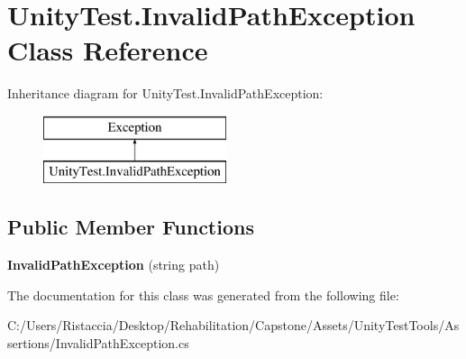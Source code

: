 \hypertarget{class_unity_test_1_1_invalid_path_exception}{}\section{Unity\+Test.\+Invalid\+Path\+Exception Class Reference}
\label{class_unity_test_1_1_invalid_path_exception}
Inheritance diagram for Unity\+Test.\+Invalid\+Path\+Exception\+:\begin{figure}[H]
\begin{center}
\leavevmode
\includegraphics[height=2.000000cm]{class_unity_test_1_1_invalid_path_exception}
\end{center}
\end{figure}
\subsection*{Public Member Functions}
\begin{DoxyCompactItemize}
\item 
\mbox{\label{class_unity_test_1_1_invalid_path_exception_a3a3dfe68665e068e34a87ed8473cde4d}} 
{\bfseries Invalid\+Path\+Exception} (string path)
\end{DoxyCompactItemize}


The documentation for this class was generated from the following file\+:\begin{DoxyCompactItemize}
\item 
C\+:/\+Users/\+Ristaccia/\+Desktop/\+Rehabilitation/\+Capstone/\+Assets/\+Unity\+Test\+Tools/\+Assertions/Invalid\+Path\+Exception.\+cs\end{DoxyCompactItemize}
